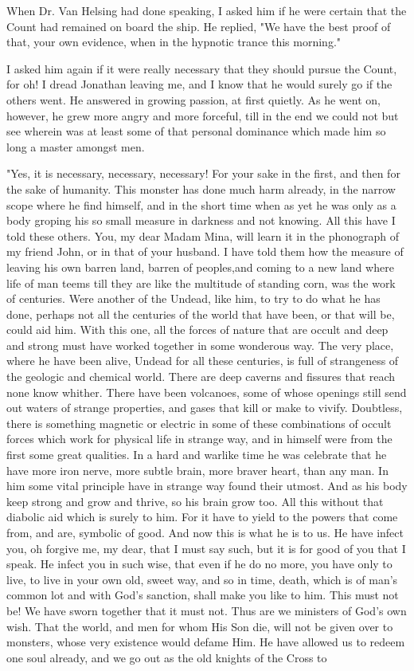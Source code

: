 When Dr. Van Helsing had done speaking, I asked him if he were certain that the Count had remained on board the ship. He replied, "We have the best proof of that, your own evidence, when in the hypnotic trance this morning." 

I asked him again if it were really necessary that they should pursue the Count, for oh! I dread Jonathan leaving me, and I know that he would surely go if the others went. He answered in growing passion, at first quietly. As he went on, however, he grew more angry and more forceful, till in the end we could not but see wherein was at least some of that personal dominance which made him so long a master amongst men. 

"Yes, it is necessary, necessary, necessary! For your sake in the first, and then for the sake of humanity. This monster has done much harm already, in the narrow scope where he find himself, and in the short time when as yet he was only as a body groping his so small measure in darkness and not knowing. All this have I told these others. You, my dear Madam Mina, will learn it in the phonograph of my friend John, or in that of your husband. I have told them how the measure of leaving his own barren land, barren of peoples,and coming to a new land where life of man teems till they are like the multitude of standing corn, was the work of centuries. Were another of the Undead, like him, to try to do what he has done, perhaps not all the centuries of the world that have been, or that will be, could aid him. With this one, all the forces of nature that are occult and deep and strong must have worked together in some wonderous way. The very place, where he have been alive, Undead for all these centuries, is full of strangeness of the geologic and chemical world. There are deep caverns and fissures that reach none know whither. There have been volcanoes, some of whose openings still send out waters of strange properties, and gases that kill or make to vivify. Doubtless, there is something magnetic or electric in some of these combinations of occult forces which work for physical life in strange way, and in himself were from the first some great qualities. In a hard and warlike time he was celebrate that he have more iron nerve, more subtle brain, more braver heart, than any man. In him some vital principle have in strange way found their utmost. And as his body keep strong and grow and thrive, so his brain grow too. All this without that diabolic aid which is surely to him. For it have to yield to the powers that come from, and are, symbolic of good. And now this is what he is to us. He have infect you, oh forgive me, my dear, that I must say such, but it is for good of you that I speak. He infect you in such wise, that even if he do no more, you have only to live, to live in your own old, sweet way, and so in time, death, which is of man's common lot and with God's sanction, shall make you like to him. This must not be! We have sworn together that it must not. Thus are we ministers of God's own wish. That the world, and men for whom His Son die, will not be given over to monsters, whose very existence would defame Him. He have allowed us to redeem one soul already, and we go out as the old knights of the Cross to 